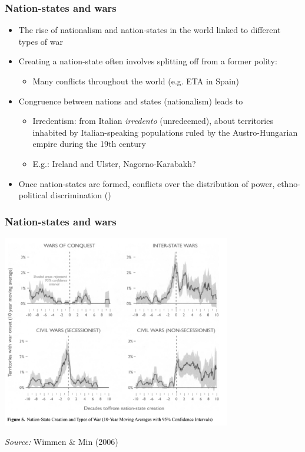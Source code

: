 \documentclass[aspectratio=43, handout]{beamer}
\begin{document}
\begin{frame}
\frametitle{Nation-states and wars}
\centering

\begin{itemize}[<+->]
  \item The rise of nationalism and nation-states in the world linked to different types of war
  \item Creating a nation-state often involves splitting off from a former polity: 
  \begin{itemize}
    \item Many conflicts throughout the world (e.g. ETA in Spain)
  \end{itemize}
  \item Congruence between nations and states (nationalism) leads to 
  \begin{itemize}
    \item Irredentism: from Italian \textit{irredento} (unredeemed), about territories inhabited by Italian-speaking populations ruled by the Austro-Hungarian empire during the 19th century
    \item E.g.: Ireland and Ulster, Nagorno-Karabakh?
  \end{itemize}
  \item Once nation-states are formed, conflicts over the distribution of power, ethno-political discrimination ()
\end{itemize}

\end{frame}

\begin{frame}
\frametitle{Nation-states and wars}
\centering

\includegraphics[width = 0.75\textwidth]{img/wimmer_min_fig5}

{\scriptsize \textit{Source:} Wimmen \& Min (2006)}

\end{frame}
\end{document}
